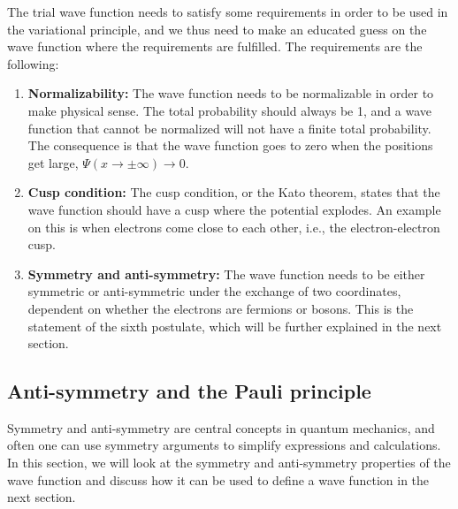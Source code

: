 The trial wave function needs to satisfy some requirements in order to be used in the variational principle, and we thus need to make an educated guess on the wave function where the requirements are fulfilled. The requirements are the following:
\fi

\begin{enumerate}
	\item \textbf{Normalizability:} The wave function needs to be normalizable in order to make physical sense. The total probability should always be 1, and a wave function that cannot be normalized will not have a finite total probability. The consequence is that the wave function goes to zero when the positions get large, $\Psi(x\rightarrow\pm\infty)\rightarrow 0$. 
	
	\item \textbf{Cusp condition:} The cusp condition, or the Kato theorem, states that the wave function should have a cusp where the potential explodes. An example on this is when electrons come close to each other, i.e., the electron-electron cusp.
	
	\item \textbf{Symmetry and anti-symmetry:} The wave function needs to be either symmetric or anti-symmetric under the exchange of two coordinates, dependent on whether the electrons are fermions or bosons. This is the statement of the sixth postulate, which will be further explained in the next section.
\end{enumerate}

\subsection{Anti-symmetry and the Pauli principle} \label{sec:symmetry}
Symmetry and anti-symmetry are central concepts in quantum mechanics, and often one can use symmetry arguments to simplify expressions and calculations. In this section, we will look at the symmetry and anti-symmetry properties of the wave function and discuss how it can be used to define a wave function in the next section.

